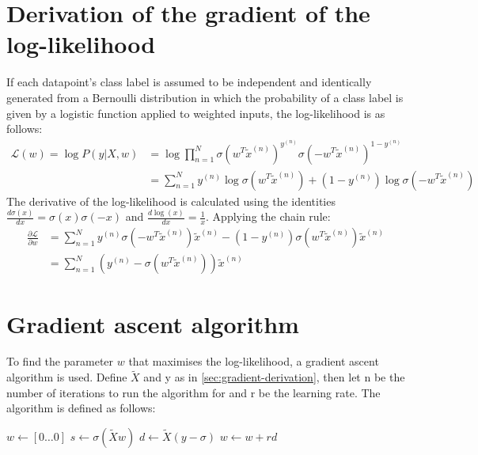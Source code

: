 \documentclass[a4paper]{article}
\begin{document}
    \section{Derivation of the gradient of the log-likelihood}\label{sec:gradient-derivation}
    If each datapoint's class label is assumed to be independent and identically generated from a Bernoulli distribution
    in which the probability of a class label is given by a logistic function applied to weighted inputs, the
    log-likelihood is as follows:
    \begin{align*}
        \mathcal{L}(w) = \log P(y|X, w) &= \log \prod_{n=1}^{N} \sigma(w^T \tilde{x}^{(n)})^{y^{(n)}}\sigma(-w^T \tilde{x}^{(n)})^{1-y^{(n)}} \\
        &= \sum_{n=1}^{N} y^{(n)} \log\sigma(w^T \tilde{x}^{(n)}) + (1-y^{(n)}) \log\sigma(-w^T \tilde{x}^{(n)})
    \end{align*}
    The derivative of the log-likelihood is calculated using the identities $\frac{d\sigma(x)}{dx} = \sigma(x)\sigma(-x)$
    and $\frac{d\log(x)}{dx} = \frac{1}{x}$. Applying the chain rule:
    \begin{align*}
        \frac{\partial \mathcal{L}}{\partial w} &= \sum_{n=1}^{N} y^{(n)} \sigma(-w^T \tilde{x}^{(n)}) \tilde{x}^{(n)} - (1-y^{(n)}) \sigma(w^T \tilde{x}^{(n)})  \tilde{x}^{(n)}
        \\ &= \sum_{n=1}^{N} \left(y^{(n)} - \sigma(w^T \tilde{x}^{(n)}) \right)  \tilde{x}^{(n)}
    \end{align*}

    \section{Gradient ascent algorithm}\label{sec:gradient-ascent-algorithm}
    To find the parameter $w$ that maximises the log-likelihood, a gradient ascent algorithm is used. Define
    $\tilde{X}$ and y as in \autoref{sec:gradient-derivation}, then let n be the number of iterations to run the
    algorithm for and r be the learning rate. The algorithm is defined as follows:

    \begin{algorithmic}
            \State $w \gets [0 \dots 0]$ 
                \State $s \gets \sigma(\tilde{X}w)$
                \State $d \gets \tilde{X} (y - \sigma)$ 
                \State $w \gets w + rd $ 
            \EndFor
        \EndProcedure
    \end{algorithmic}
\end{document}
